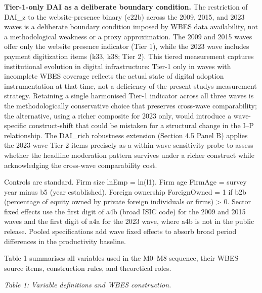 \documentclass[12pt,a4paper]{article}
\begin{document}
\textbf{Tier-1-only DAI as a deliberate boundary condition.} The
restriction of DAI\_z to the website-presence binary (c22b) across the
2009, 2015, and 2023 waves is a deliberate boundary condition imposed by
WBES data availability, not a methodological weakness or a proxy
approximation. The 2009 and 2015 waves offer only the website presence
indicator (Tier 1), while the 2023 wave includes payment digitization
items (k33, k38; Tier 2). This tiered measurement captures institutional
evolution in digital infrastructure: Tier-1 only in waves with
incomplete WBES coverage reflects the actual state of digital adoption
instrumentation at that time, not a deficiency of the present
study\textquotesingle s measurement strategy. Retaining a single
harmonised Tier-1 indicator across all three waves is the
methodologically conservative choice that preserves cross-wave
comparability; the alternative, using a richer composite for 2023 only,
would introduce a wave-specific construct-shift that could be mistaken
for a structural change in the I--P relationship. The DAI\_rich
robustness extension (Section 4.5 Panel B) applies the 2023-wave Tier-2
items precisely as a within-wave sensitivity probe to assess whether the
headline moderation pattern survives under a richer construct while
acknowledging the cross-wave comparability cost.

Controls are standard. Firm size lnEmp = ln(l1). Firm age FirmAge =
survey year minus b5 (year established). Foreign ownership ForeignOwned
= 1 if b2b (percentage of equity owned by private foreign individuals or
firms) \textgreater{} 0. Sector fixed effects use the first digit of a4b
(broad ISIC code) for the 2009 and 2015 waves and the first digit of a4a
for the 2023 wave, where a4b is not in the public release. Pooled
specifications add wave fixed effects to absorb broad period differences
in the productivity baseline.

Table 1 summarises all variables used in the M0--M8 sequence, their WBES
source items, construction rules, and theoretical roles.

\emph{Table 1: Variable definitions and WBES construction.}
\end{document}
